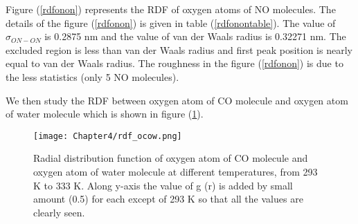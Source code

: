 \begin{table}[H]
\centering
\caption[RDF analysis between oxygen atoms of NO molecule.]
{ Simulated data for the RDF analysis between oxygen atoms of NO molecule at different temperatures, from 293 K to 333 K. } 
\label{rdfonontable}
\end{table}
 Figure (\ref{rdfonon}) represents the RDF of oxygen atoms of NO molecules. The details of the figure (\ref{rdfonon}) is given in table (\ref {rdfonontable}). The value of $\sigma_{ON-ON}$ is 0.2875 nm and the value of van der Waals radius is 0.32271 nm. The excluded region is less than van der Waals radius and first peak position is nearly equal to van der Waals radius. The roughness in the
figure (\ref{rdfonon})  is due to the less statistics (only 5 NO molecules).

We then study the RDF between oxygen atom of CO molecule and oxygen atom of water molecule
which is shown in figure (\ref {rdfocow}).
\begin{figure}[h!]
\centering
\texttt{[image: Chapter4/rdf\_ocow.png]}
\caption[Radial distribution function  of oxygen atom of CO molecule and oxygen atom of water molecule at different temperatures.]{Radial distribution function  of oxygen atom of CO molecule and oxygen atom of water molecule at different temperatures, from 293 K to 333 K. Along y-axis the value of g (r) is added by small amount (0.5) for each  except of  293 K  so that all the values are clearly seen.}
\label{rdfocow}
\end{figure}

